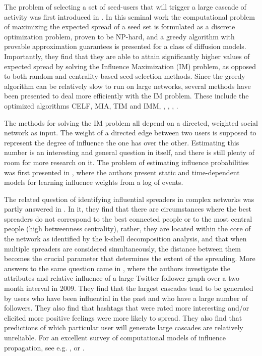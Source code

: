 \documentclass[sigconf]{acmart}
\begin{document}
The problem of selecting a set of seed-users that will trigger a large cascade of activity was first introduced in \cite{kempe2003maximizing}. In this seminal work the computational problem of maximizing the expected spread of a seed set is formulated as a discrete optimization problem, proven to be NP-hard, and a greedy algorithm with provable approximation guarantees is presented for a class of diffusion models. Importantly, they find that they are able to attain significantly higher values of expected spread by solving the Influence Maximization (IM) problem, as opposed to both random and centrality-based seed-selection methods. Since the greedy algorithm can be relatively slow to run on large networks, several methods have been presented to deal more efficiently with the IM problem. These include the optimized algorithms CELF, MIA, TIM and IMM, \cite{chen2009efficient}, \cite{chen2010scalable}, \cite{tang2014influence}, \cite{tang2015influence}. 

The methods for solving the IM problem all depend on a directed, weighted social network as input. The weight of a directed edge between two users is supposed to represent the degree of influence the one has over the other. Estimating this number is an interesting and general question in itself, and there is still plenty of room for more research on it. The problem of estimating influence probabilities was first presented in \cite{goyal2010learning}, where the authors present static and time-dependent models for learning influence weights from a log of events. 

The related question of identifying influential spreaders in complex networks was partly answered in \cite{kitsak2010identification}. In it, they find that there are circumstances where the best spreaders do not correspond to the best connected people or to the most central people (high betweenness centrality), rather, they are located within the core of the network as identified by the k-shell decomposition analysis, and that when multiple spreaders are considered simultaneously, the distance between them becomes the crucial parameter that determines the extent of the spreading. More answers to the same question came in \cite{bakshy2011everyone}, where the authors investigate the attributes and relative influence of a large Twitter follower graph over a two month interval in 2009. They find that the largest cascades tend to be generated by users who have been influential in the past and who have a large number of followers. They also find that hashtags that were rated more interesting and/or elicited more positive feelings were more likely to spread. They also find that predictions of which particular user will generate large cascades are relatively unreliable. For an excellent survey of computational models of influence propagation, see e.g. \cite{bonchi2011influence}, or \cite{gomez2012inferring}.
\end{document}
